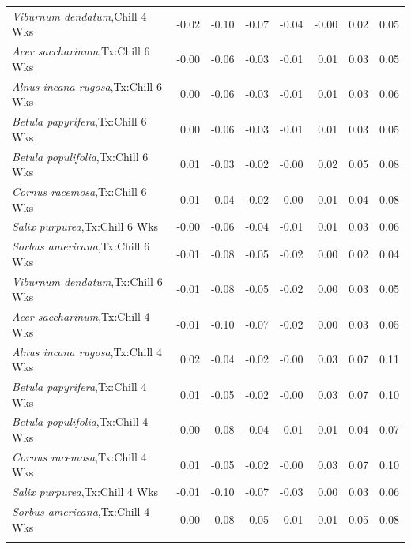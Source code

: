 \documentclass{article}\usepackage[]{graphicx}\usepackage[]{color}
\begin{document}
\begin{longtable}{lrrrrrrr}
  \textit{Viburnum dendatum},Chill 4 Wks & -0.02 & -0.10 & -0.07 & -0.04 & -0.00 & 0.02 & 0.05 \\ 
  \textit{Acer saccharinum},Tx:Chill 6 Wks & -0.00 & -0.06 & -0.03 & -0.01 & 0.01 & 0.03 & 0.05 \\ 
  \textit{Alnus incana rugosa},Tx:Chill 6 Wks & 0.00 & -0.06 & -0.03 & -0.01 & 0.01 & 0.03 & 0.06 \\ 
  \textit{Betula papyrifera},Tx:Chill 6 Wks & 0.00 & -0.06 & -0.03 & -0.01 & 0.01 & 0.03 & 0.05 \\ 
  \textit{Betula populifolia},Tx:Chill 6 Wks & 0.01 & -0.03 & -0.02 & -0.00 & 0.02 & 0.05 & 0.08 \\ 
  \textit{Cornus racemosa},Tx:Chill 6 Wks & 0.01 & -0.04 & -0.02 & -0.00 & 0.01 & 0.04 & 0.08 \\ 
  \textit{Salix purpurea},Tx:Chill 6 Wks & -0.00 & -0.06 & -0.04 & -0.01 & 0.01 & 0.03 & 0.06 \\ 
  \textit{Sorbus americana},Tx:Chill 6 Wks & -0.01 & -0.08 & -0.05 & -0.02 & 0.00 & 0.02 & 0.04 \\ 
  \textit{Viburnum dendatum},Tx:Chill 6 Wks & -0.01 & -0.08 & -0.05 & -0.02 & 0.00 & 0.03 & 0.05 \\ 
  \textit{Acer saccharinum},Tx:Chill 4 Wks & -0.01 & -0.10 & -0.07 & -0.02 & 0.00 & 0.03 & 0.05 \\ 
  \textit{Alnus incana rugosa},Tx:Chill 4 Wks & 0.02 & -0.04 & -0.02 & -0.00 & 0.03 & 0.07 & 0.11 \\ 
  \textit{Betula papyrifera},Tx:Chill 4 Wks & 0.01 & -0.05 & -0.02 & -0.00 & 0.03 & 0.07 & 0.10 \\ 
  \textit{Betula populifolia},Tx:Chill 4 Wks & -0.00 & -0.08 & -0.04 & -0.01 & 0.01 & 0.04 & 0.07 \\ 
  \textit{Cornus racemosa},Tx:Chill 4 Wks & 0.01 & -0.05 & -0.02 & -0.00 & 0.03 & 0.07 & 0.10 \\ 
  \textit{Salix purpurea},Tx:Chill 4 Wks & -0.01 & -0.10 & -0.07 & -0.03 & 0.00 & 0.03 & 0.06 \\ 
  \textit{Sorbus americana},Tx:Chill 4 Wks & 0.00 & -0.08 & -0.05 & -0.01 & 0.01 & 0.05 & 0.08 \\ 
   \hline
\hline
\label{tab:suppmodtough}
\end{longtable}
\end{document}
